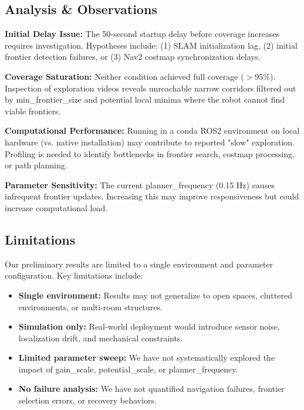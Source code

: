 \documentclass[conference]{IEEEtran}
\begin{document}
\subsection{Analysis \& Observations}

\textbf{Initial Delay Issue:} The 50-second startup delay before coverage increases requires investigation. Hypotheses include: (1) SLAM initialization lag, (2) initial frontier detection failures, or (3) Nav2 costmap synchronization delays.

\textbf{Coverage Saturation:} Neither condition achieved full coverage ($>$95\%). Inspection of exploration videos reveals unreachable narrow corridors filtered out by min\_frontier\_size and potential local minima where the robot cannot find viable frontiers.

\textbf{Computational Performance:} Running in a conda ROS2 environment on local hardware (vs. native installation) may contribute to reported "slow" exploration. Profiling is needed to identify bottlenecks in frontier search, costmap processing, or path planning.

\textbf{Parameter Sensitivity:} The current planner\_frequency (0.15 Hz) causes infrequent frontier updates. Increasing this may improve responsiveness but could increase computational load.

\subsection{Limitations}

Our preliminary results are limited to a single environment and parameter configuration. Key limitations include:

\begin{itemize}
    \item \textbf{Single environment:} Results may not generalize to open spaces, cluttered environments, or multi-room structures.
    \item \textbf{Simulation only:} Real-world deployment would introduce sensor noise, localization drift, and mechanical constraints.
    \item \textbf{Limited parameter sweep:} We have not systematically explored the impact of gain\_scale, potential\_scale, or planner\_frequency.
    \item \textbf{No failure analysis:} We have not quantified navigation failures, frontier selection errors, or recovery behaviors.
\end{itemize}
\end{document}
